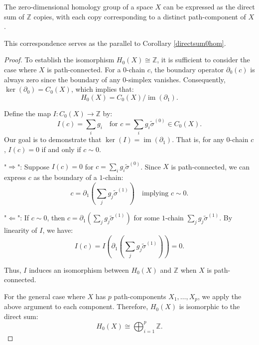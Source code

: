 \begin{proposition}
	The zero-dimensional homology group of a space $X$ can be expressed as the direct
	sum of $\mathbb{Z}$ copies, with each copy corresponding to a distinct path-component
	of $X$.
\end{proposition}

This correspondence serves as the parallel to Corollary \ref{directsum0hom}.

\begin{proof}
	To establish the isomorphism $H_{0}(X) \cong \mathbb{Z}$, it is sufficient to
	consider the case where $X$ is path-connected. For a $0$-chain $c$, the
	boundary operator $\partial_{0}(c)$ is always zero since the boundary of any
	$0$-simplex vanishes. Consequently, $\ker(\partial_{0}) = C_{0}(X)$, which implies
	that:
	\[
		H_{0}(X) = C_{0}(X) / \operatorname{im}(\partial_{1}).
	\]

	Define the map $I: C_{0}(X) \to \mathbb{Z}$ by:
	\[
		I(c) = \sum_{i} g_{i} \quad \text{for }c = \sum_{i} g_{i} \tilde{\sigma}^{(0)}
		\in C_{0}(X).
	\]
	Our goal is to demonstrate that $\ker(I) = \operatorname{im}(\partial_{1})$. That
	is, for any $0$-chain $c$, $I(c) = 0$ if and only if $c \sim 0$.

	"$\Rightarrow$": Suppose $I(c) = 0$ for
	$c = \sum_{i} g_{i} \tilde{\sigma}^{(0)}$. Since $X$ is path-connected, we can
	express $c$ as the boundary of a $1$-chain:
	\[
		c = \partial_{1} \left( \sum_{j} g_{j} \tilde{\sigma}^{(1)}\right) \quad \text{implying
		}c \sim 0.
	\]

	"$\Leftarrow$": If $c \sim 0$, then
	$c = \partial_{1} \left( \sum_{j} g_{j} \tilde{\sigma}^{(1)}\right)$ for some
	$1$-chain $\sum_{j} g_{j} \tilde{\sigma}^{(1)}$. By linearity of $I$, we have:
	\[
		I(c) = I \left( \partial_{1} \left( \sum_{j} g_{j} \tilde{\sigma}^{(1)}\right
		) \right) = 0.
	\]

	Thus, $I$ induces an isomorphism between $H_{0}(X)$ and $\mathbb{Z}$ when $X$ is
	path-connected.

	For the general case where $X$ has $p$ path-components $X_{1}, \ldots, X_{p}$,
	we apply the above argument to each component. Therefore, $H_{0}(X)$ is
	isomorphic to the direct sum:
	\[
		H_{0}(X) \cong \bigoplus_{i=1}^{p}\mathbb{Z}.
	\]
\end{proof}

